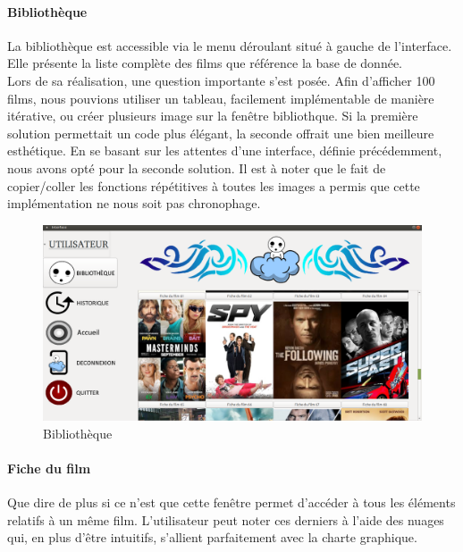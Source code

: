 \documentclass{article}
\begin{document}
\paragraph{Bibliothèque}
La bibliothèque est accessible via le menu déroulant situé à gauche de l'interface. Elle présente la liste complète des films que référence la base de donnée.\\

Lors de sa réalisation, une question importante s'est posée. Afin d'afficher 100 films, nous pouvions utiliser un tableau, facilement implémentable de manière itérative, ou créer plusieurs image sur la fenêtre bibliothque. Si la première solution permettait un code plus élégant, la seconde offrait une bien meilleure esthétique. En se basant sur les attentes  d'une interface, définie précédemment, nous avons opté pour la seconde solution. Il est à noter que le fait de copier/coller les fonctions répétitives à toutes les images a permis que cette implémentation ne nous soit pas chronophage.

\begin{figure}[H]
    \centering
    \includegraphics[scale=0.3]{Images/interface3.png}
    \caption{\label{3} Bibliothèque}
\end{figure}

\paragraph{Fiche du film}

Que dire de plus si ce n'est que cette fenêtre permet d'accéder à tous les éléments relatifs à un même film. L'utilisateur peut noter ces derniers à l'aide des nuages qui, en plus d'être intuitifs, s'allient parfaitement avec la charte graphique.
\end{document}
